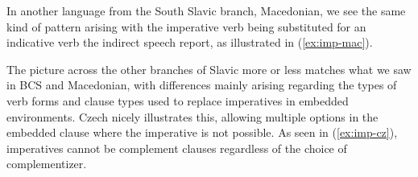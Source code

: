\documentclass[output=paper,colorlinks,citecolor=brown]{langscibook}
\begin{document}
\noindent In another language from the South Slavic branch, Macedonian, we see the same kind of pattern arising with the imperative verb being substituted for an indicative verb the indirect speech report, as illustrated in (\ref{ex:imp-mac}).%
\ea \label{ex:imp-mac}
\z\z 

\noindent The picture across the other branches of Slavic more or less matches what we saw in BCS and Macedonian, with differences mainly arising regarding the types of verb forms and clause types used to replace imperatives in embedded environments. Czech nicely illustrates this, allowing multiple options in the embedded clause where the imperative is not possible. As seen in (\ref{ex:imp-cz}), imperatives cannot be complement clauses regardless of the choice of complementizer.%
\ea \label{ex:imp-cz} 
\z\z 
\end{document}
